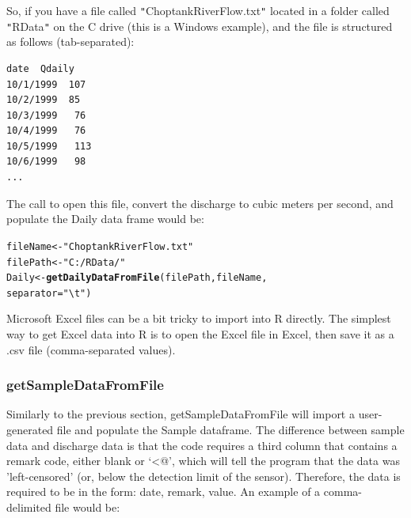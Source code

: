 \documentclass[a4paper,11pt]{article}\usepackage[]{graphicx}\usepackage[]{color}
\makeatletter
\newcommand{\hlstr}[1]{\textcolor[rgb]{0.192,0.494,0.8}{#1}}%
\newcommand{\hlstd}[1]{\textcolor[rgb]{0.345,0.345,0.345}{#1}}%
\newcommand{\hlkwb}[1]{\textcolor[rgb]{0.69,0.353,0.396}{#1}}%
\newcommand{\hlkwc}[1]{\textcolor[rgb]{0.333,0.667,0.333}{#1}}%
\newcommand{\hlkwd}[1]{\textcolor[rgb]{0.737,0.353,0.396}{\textbf{#1}}}%
\newenvironment{kframe}{%
 \def\at@end@of@kframe{}%
 \ifinner\ifhmode%
  \def\at@end@of@kframe{\end{minipage}}%
  \begin{minipage}{\columnwidth}%
 \fi\fi%
 \def\FrameCommand##1{\hskip\@totalleftmargin \hskip-\fboxsep
 \colorbox{shadecolor}{##1}\hskip-\fboxsep
     \hskip-\linewidth \hskip-\@totalleftmargin \hskip\columnwidth}%
 \MakeFramed {\advance\hsize-\width
   \@totalleftmargin\z@ \linewidth\hsize
   \@setminipage}}%
 {\par\unskip\endMakeFramed%
 \at@end@of@kframe}
\newenvironment{knitrout}{}{} %
\makeatother
\begin{document}
So, if you have a file called \texttt{"}ChoptankRiverFlow.txt\texttt{"} located in a folder called \texttt{"}RData\texttt{"} on the C drive (this is a Windows example), and the file is structured as follows (tab-separated):
\begin{verbatim}
date  Qdaily
10/1/1999  107
10/2/1999  85
10/3/1999	76
10/4/1999	76
10/5/1999	113
10/6/1999	98
...
\end{verbatim}

The call to open this file, convert the discharge to cubic meters per second, and populate the Daily data frame would be:
\begin{knitrout}
\color{fgcolor}\begin{kframe}
\begin{alltt}
\hlstd{fileName} \hlkwb{<-} \hlstr{"ChoptankRiverFlow.txt"}
\hlstd{filePath} \hlkwb{<-}  \hlstr{"C:/RData/"}
\hlstd{Daily} \hlkwb{<-} \hlkwd{getDailyDataFromFile}\hlstd{(filePath,fileName,}
                    \hlkwc{separator}\hlstd{=}\hlstr{"\textbackslash{}t"}\hlstd{)}
\end{alltt}
\end{kframe}
\end{knitrout}


Microsoft Excel files can be a bit tricky to import into R directly. The simplest way to get Excel data into R is to open the Excel file in Excel, then save it as a .csv file (comma-separated values). 

\FloatBarrier

\subsubsection{getSampleDataFromFile}
Similarly to the previous section, getSampleDataFromFile will import a user-generated file and populate the Sample dataframe. The difference between sample data and discharge data is that the code requires a third column that contains a remark code, either blank or `\verb@<@', which will tell the program that the data was 'left-censored' (or, below the detection limit of the sensor). Therefore, the data is required to be in the form: date, remark, value.   An example of a comma-delimited file would be:
\end{document}

